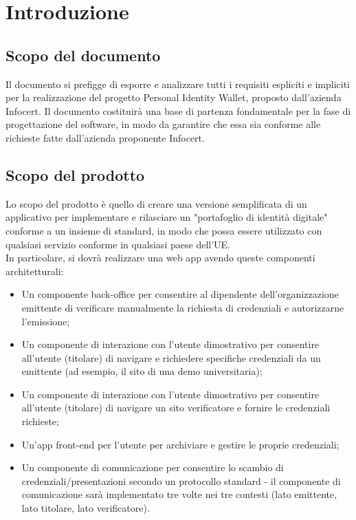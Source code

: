 \section{Introduzione}

\subsection{Scopo del documento}
Il documento si prefigge di esporre e analizzare tutti i requisiti espliciti e impliciti per la realizzazione del progetto Personal Identity Wallet, proposto dall'azienda Infocert. 
Il documento costituirà una base di partenza fondamentale per la fase di progettazione del software, in modo da garantire che essa sia conforme alle richieste fatte dall'azienda 
proponente Infocert.


\subsection{Scopo del prodotto}
Lo scopo del prodotto è quello di creare una versione semplificata di un applicativo per implementare e rilasciare un "portafoglio di identità digitale" conforme a un insieme di 
standard, in modo che possa essere utilizzato con qualsiasi servizio conforme in qualsiasi paese dell'UE. \\
In particolare, si dovrà realizzare una web app avendo queste componenti architetturali:
\begin{itemize}
    \item Un componente back-office per consentire al dipendente dell'organizzazione emittente di verificare manualmente la richiesta di credenziali e autorizzarne l'emissione; 
    \item Un componente di interazione con l'utente dimostrativo per consentire all'utente (titolare) di navigare e richiedere specifiche credenziali da un emittente 
(ad esempio, il sito di una demo universitaria); 
    \item Un componente di interazione con l'utente dimostrativo per consentire all'utente (titolare) di navigare un sito verificatore e fornire le credenziali richieste;
    \item Un'app front-end per l'utente per archiviare e gestire le proprie credenziali; 
    \item Un componente di comunicazione per consentire lo scambio di credenziali/presentazioni secondo un protocollo standard - il componente di comunicazione sarà implementato 
tre volte nei tre contesti (lato emittente, lato titolare, lato verificatore).
\end{itemize}

